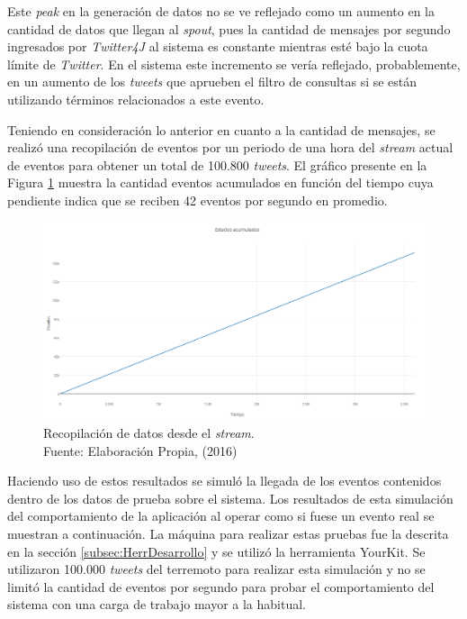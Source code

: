 Este \textit{peak} en la generación de datos no se ve reflejado como un aumento en la cantidad de datos que llegan al \textit{spout}, pues la cantidad de mensajes por segundo ingresados por \textit{Twitter4J} al sistema es constante mientras esté bajo la cuota límite de \textit{Twitter}. En el sistema este incremento se vería reflejado, probablemente, en un aumento de los \textit{tweets} que aprueben el filtro de consultas si se están utilizando términos relacionados a este evento.

Teniendo en consideración lo anterior en cuanto a la cantidad de mensajes, se realizó una recopilación de eventos por un periodo de una hora del \textit{stream} actual de eventos para obtener un total de 100.800 \textit{tweets}. El gráfico presente en la Figura \ref{fig:graficoAcumulado} muestra la cantidad eventos acumulados en función del tiempo cuya pendiente indica que se reciben 42 eventos por segundo en promedio.

\begin{figure}[H]
        \centering
        \captionsetup{justification=centering}
        \includegraphics[scale=0.5]{images/DatosAcumulados.png}
        \caption[Recopilación de datos desde el \textit{stream}.]{Recopilación de datos desde el \textit{stream}.\\Fuente: Elaboración Propia, (2016)}
        \label{fig:graficoAcumulado}
\end{figure}

Haciendo uso de estos resultados se simuló la llegada de los eventos contenidos dentro de los datos de prueba sobre el sistema. Los resultados de esta simulación del comportamiento de la aplicación al operar como si fuese un evento real se muestran a continuación. La máquina para realizar estas pruebas fue la descrita en la sección \ref{subsec:HerrDesarrollo} y se utilizó la herramienta YourKit. Se utilizaron 100.000 \textit{tweets} del terremoto para realizar esta simulación y no se limitó la cantidad de eventos por segundo para probar el comportamiento del sistema con una carga de trabajo mayor a la habitual.

